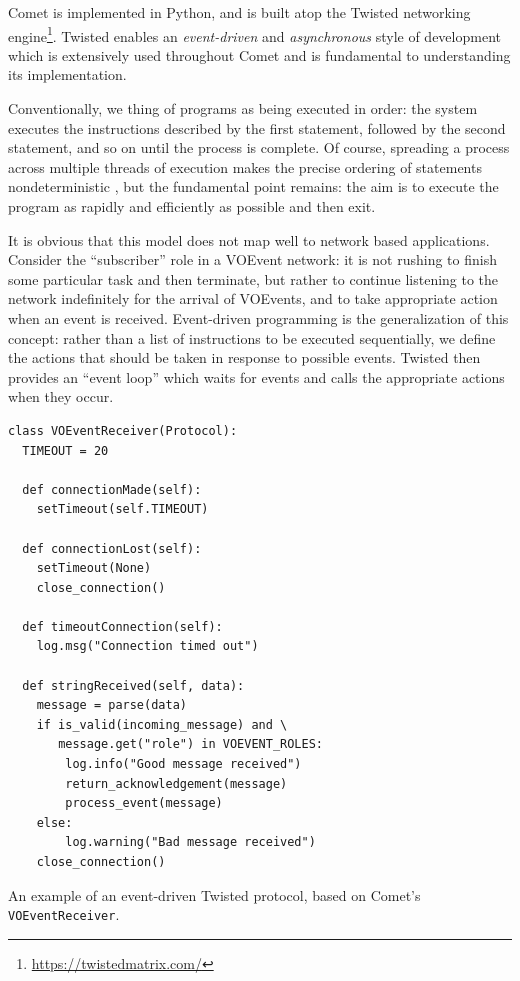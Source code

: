 \documentclass[5p,authoryear]{elsarticle}
\begin{document}
Comet is implemented in Python, and is built atop the Twisted networking
engine\footnote{\url{https://twistedmatrix.com/}}. Twisted enables an
\textit{event-driven} and \textit{asynchronous} style of development which is
extensively used throughout Comet and is fundamental to understanding its
implementation.

Conventionally, we thing of programs as being executed in order: the system
executes the instructions described by the first statement, followed by the
second statement, and so on until the process is complete. Of course,
spreading a process across multiple threads of execution makes the precise
ordering of statements nondeterministic \citep[and, indeed, introduces a whole
new level of complexity in the process;][]{Lee:2006}, but the fundamental
point remains: the aim is to execute the program as rapidly and efficiently as
possible and then exit.

It is obvious that this model does not map well to network based applications.
Consider the ``subscriber'' role in a VOEvent network: it is not rushing to
finish some particular task and then terminate, but rather to continue
listening to the network indefinitely for the arrival of VOEvents, and to
take appropriate action when an event is received. Event-driven programming is
the generalization of this concept: rather than a list of instructions to be
executed sequentially, we define the actions that should be taken in response
to possible events. Twisted then provides an ``event loop'' which waits for
events and calls the appropriate actions when they occur.

\begin{listing}[H]
\begin{verbatim}
class VOEventReceiver(Protocol):
  TIMEOUT = 20

  def connectionMade(self):
    setTimeout(self.TIMEOUT)

  def connectionLost(self):
    setTimeout(None)
    close_connection()

  def timeoutConnection(self):
    log.msg("Connection timed out")

  def stringReceived(self, data):
    message = parse(data)
    if is_valid(incoming_message) and \
       message.get("role") in VOEVENT_ROLES:
        log.info("Good message received")
        return_acknowledgement(message)
        process_event(message)
    else:
        log.warning("Bad message received")
    close_connection()
\end{verbatim}
\caption{An example of an event-driven Twisted protocol, based on Comet's
\texttt{VOEventReceiver}.}
\label{lst:event}
\end{listing}
\end{document}
